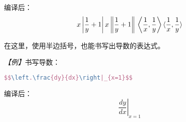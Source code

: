 编译后：
\begin{equation}
    x\left|\frac{1}{y}+1\right| \\
    x\left\|\frac{1}{y}+1\right\| \\
    \left<\frac{1}{x},\frac{1}{y}\right> \\
    \langle\frac{1}{x},\frac{1}{y}\rangle
\end{equation}

在这里，使用半边括号，也能书写出导数的表达式。

\emph{【例】}书写导数：
\begin{lstlisting}[language=TeX]
    $$\left.\frac{dy}{dx}\right|_{x=1}$$
\end{lstlisting}

编译后：
$$\left.\frac{dy}{dx}\right|_{x=1}$$
